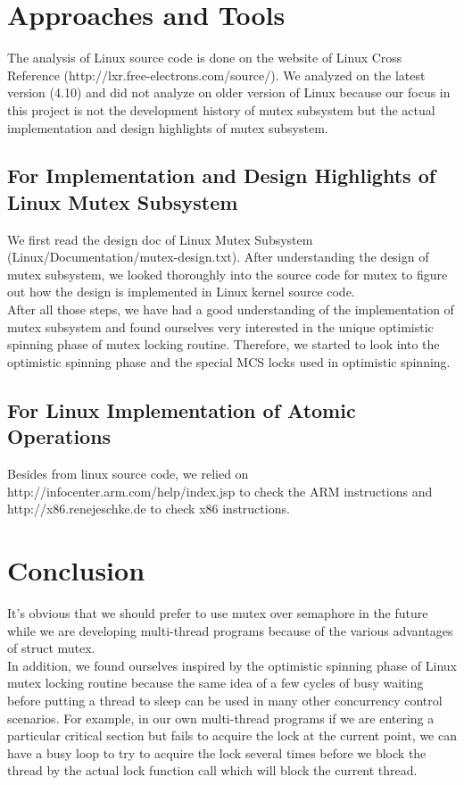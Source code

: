 \documentclass[10pt]{sigplanconf}
\begin{document}
\vspace{50pt}

\section{Approaches and Tools}
The analysis of Linux source code is done on the website of Linux Cross Reference (http://lxr.free-electrons.com/source/). We analyzed on the latest version (4.10) and did not analyze on older version of Linux because our focus in this project is not the development history of mutex subsystem but the actual implementation and design highlights of mutex subsystem.\\
\subsection{For Implementation and Design Highlights of Linux Mutex Subsystem}
We first read the design doc of Linux Mutex Subsystem (Linux/Documentation/mutex-design.txt). After understanding the design of mutex subsystem, we looked thoroughly into the source code for mutex to figure out how the design is implemented in Linux kernel source code. \\
After all those steps, we have had a good understanding of the implementation of mutex subsystem and found ourselves very interested in the unique optimistic spinning phase of mutex locking routine. Therefore, we started to look into the optimistic spinning phase and the special MCS locks used in optimistic spinning. \\

\subsection{For Linux Implementation of Atomic Operations}
Besides from linux source code, we relied on\\ http://infocenter.arm.com/help/index.jsp to check the ARM instructions and http://x86.renejeschke.de to check x86 instructions. \\

\vspace{50pt}

\section{Conclusion}
It's obvious that we should prefer to use mutex over semaphore in the future while we are developing multi-thread programs because of the various advantages of struct mutex. \\
In addition, we found ourselves inspired by the optimistic spinning phase of Linux mutex locking routine because the same idea of a few cycles of busy waiting before putting a thread to sleep can be used in many other concurrency control scenarios. For example, in our own multi-thread programs if we are entering a particular critical section but fails to acquire the lock at the current point, we can have a busy loop to try to acquire the lock several times before we block the thread by the actual lock function call which will block the current thread. 
\end{document}
